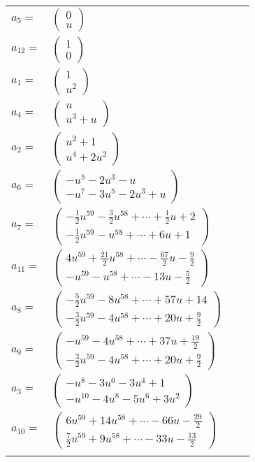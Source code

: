 \documentclass[1p]{elsarticle_modified}
\theoremstyle{definition}
\begin{document}
\begin{tabular}{m{7pt} m{180pt} m{7pt} m{180pt} }
\flushright $a_{5}=$&$\begin{pmatrix}0\\u\end{pmatrix}$ \\
\flushright $a_{12}=$&$\begin{pmatrix}1\\0\end{pmatrix}$ \\
\flushright $a_{1}=$&$\begin{pmatrix}1\\u^2\end{pmatrix}$ \\
\flushright $a_{4}=$&$\begin{pmatrix}u\\u^3+u\end{pmatrix}$ \\
\flushright $a_{2}=$&$\begin{pmatrix}u^2+1\\u^4+2 u^2\end{pmatrix}$ \\
\flushright $a_{6}=$&$\begin{pmatrix}- u^5-2 u^3- u\\- u^7-3 u^5-2 u^3+u\end{pmatrix}$ \\
\flushright $a_{7}=$&$\begin{pmatrix}-\frac{1}{2} u^{59}-\frac{3}{2} u^{58}+\cdots+\frac{1}{2} u+2\\-\frac{1}{2} u^{59}- u^{58}+\cdots+6 u+1\end{pmatrix}$ \\
\flushright $a_{11}=$&$\begin{pmatrix}4 u^{59}+\frac{21}{2} u^{58}+\cdots-\frac{67}{2} u-\frac{9}{2}\\- u^{59}- u^{58}+\cdots-13 u-\frac{5}{2}\end{pmatrix}$ \\
\flushright $a_{8}=$&$\begin{pmatrix}-\frac{5}{2} u^{59}-8 u^{58}+\cdots+57 u+14\\-\frac{3}{2} u^{59}-4 u^{58}+\cdots+20 u+\frac{9}{2}\end{pmatrix}$ \\
\flushright $a_{9}=$&$\begin{pmatrix}- u^{59}-4 u^{58}+\cdots+37 u+\frac{19}{2}\\-\frac{3}{2} u^{59}-4 u^{58}+\cdots+20 u+\frac{9}{2}\end{pmatrix}$ \\
\flushright $a_{3}=$&$\begin{pmatrix}- u^8-3 u^6-3 u^4+1\\- u^{10}-4 u^8-5 u^6+3 u^2\end{pmatrix}$ \\
\flushright $a_{10}=$&$\begin{pmatrix}6 u^{59}+14 u^{58}+\cdots-66 u-\frac{29}{2}\\\frac{7}{2} u^{59}+9 u^{58}+\cdots-33 u-\frac{13}{2}\end{pmatrix}$\\&\end{tabular}
\end{document}
